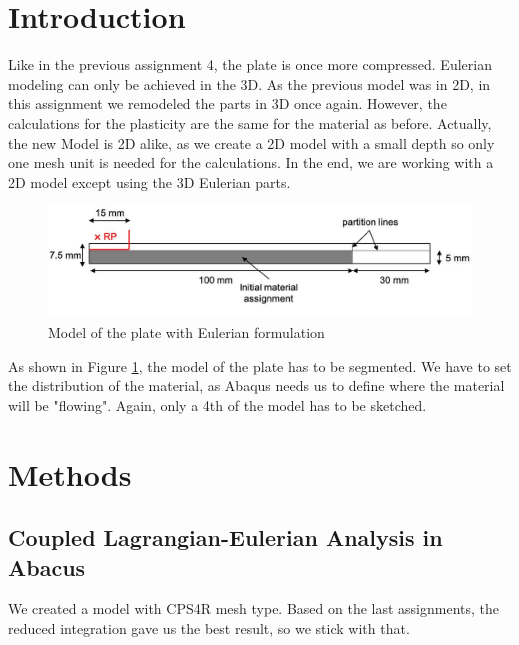 \documentclass[12pt]{article}
\begin{document}

\tableofcontents
\pagebreak
\section{Introduction}
Like in the previous assignment 4, the plate is once more compressed. Eulerian modeling can only be achieved in the 3D. As the previous model was in 2D, in this assignment we remodeled the parts in 3D once again. However, the calculations for the plasticity are the same for the material as before. Actually, the new Model is 2D alike, as we create a 2D model with a small depth so only one mesh unit is needed for the calculations. In the end, we are working with a 2D model except using the 3D Eulerian parts. 

\begin{figure}[!htb]
  \centering
  \includegraphics[width=1.0\linewidth]{pics/shematics}
  \caption{Model of the plate with Eulerian formulation}
  \label{fig:1}
\end{figure}

\noindent As shown in Figure \ref{fig:1}, the model of the plate has to be segmented. We have to set the distribution of the material, as Abaqus needs us to define where the material will be "flowing". Again, only a 4th of the model has to be sketched.

\newpage
\section{Methods}

\subsection{Coupled Lagrangian-Eulerian Analysis in Abacus}

We created a model with CPS4R mesh type. Based on the last assignments, the reduced integration
gave us the best result, so we stick with that.
\end{document}
